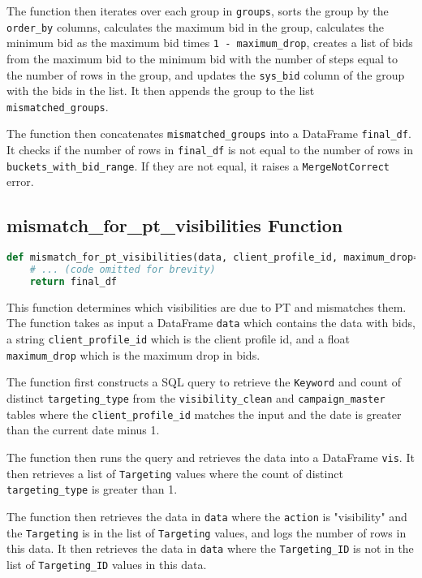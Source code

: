 The function then iterates over each group in \verb|groups|, sorts the group by the \verb|order_by| columns, calculates the maximum bid in the group, calculates the minimum bid as the maximum bid times \verb|1 - maximum_drop|, creates a list of bids from the maximum bid to the minimum bid with the number of steps equal to the number of rows in the group, and updates the \verb|sys_bid| column of the group with the bids in the list. It then appends the group to the list \verb|mismatched_groups|.

The function then concatenates \verb|mismatched_groups| into a DataFrame \verb|final_df|. It checks if the number of rows in \verb|final_df| is not equal to the number of rows in \verb|buckets_with_bid_range|. If they are not equal, it raises a \verb|MergeNotCorrect| error.

\subsection{mismatch\_for\_pt\_visibilities Function}

\begin{lstlisting}[language=Python]
def mismatch_for_pt_visibilities(data, client_profile_id, maximum_drop=0.4):
    # ... (code omitted for brevity)
    return final_df
\end{lstlisting}

This function determines which visibilities are due to PT and mismatches them. The function takes as input a DataFrame \verb|data| which contains the data with bids, a string \verb|client_profile_id| which is the client profile id, and a float \verb|maximum_drop| which is the maximum drop in bids.

The function first constructs a SQL query to retrieve the \verb|Keyword| and count of distinct \verb|targeting_type| from the \verb|visibility_clean| and \verb|campaign_master| tables where the \verb|client_profile_id| matches the input and the date is greater than the current date minus 1.

The function then runs the query and retrieves the data into a DataFrame \verb|vis|. It then retrieves a list of \verb|Targeting| values where the count of distinct \verb|targeting_type| is greater than 1.

The function then retrieves the data in \verb|data| where the \verb|action| is "visibility" and the \verb|Targeting| is in the list of \verb|Targeting| values, and logs the number of rows in this data. It then retrieves the data in \verb|data| where the \verb|Targeting_ID| is not in the list of \verb|Targeting_ID| values in this data.

